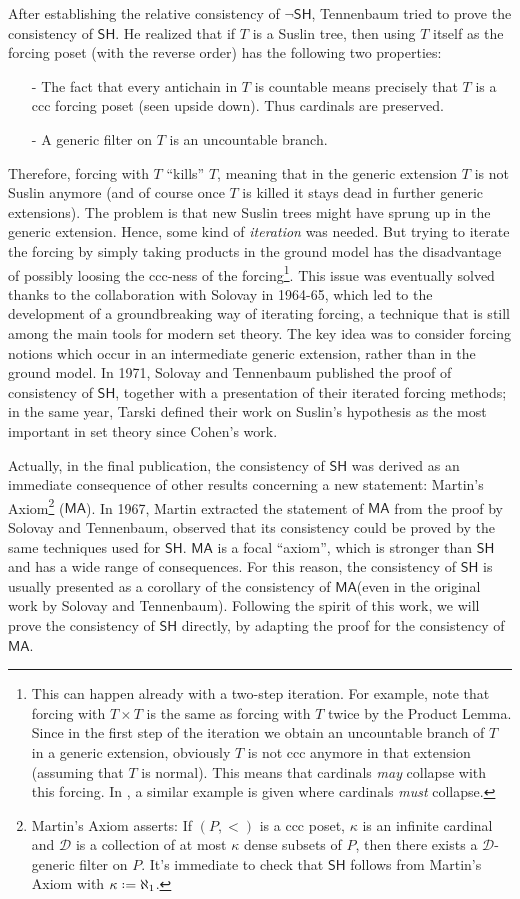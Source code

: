\documentclass[11pt,a4paper]{report}
\theoremstyle{definition}
\theoremstyle{num.custom-title}
\theoremstyle{custom-title}
\newcommand{\SH}{\ensuremath{\mathsf{SH}}\xspace}
\newcommand{\nSH}{\ensuremath{\neg\mathsf{SH}}\xspace}
\newcommand{\MA}{\ensuremath{\mathsf{MA}}\xspace}
\newcommand*{\defeq}{\mathrel{\rlap{%
                     \raisebox{0.3ex}{$\cdot$}}%
                     \raisebox{-0.3ex}{$\cdot$}}%
                     =}
\begin{document}
After establishing the relative consistency of $\nSH$, Tennenbaum tried to prove the consistency of $\SH$. He realized that if $T$ is a Suslin tree, then using $T$ itself as the forcing poset (with the reverse order) has the following two properties:
\begin{itemize}
\item[-] The fact that every antichain in $T$ is countable means precisely that $T$ is a ccc forcing poset (seen upside down). Thus cardinals are preserved.
\item[-] A generic filter on $T$ is an uncountable branch.
\end{itemize}
Therefore, forcing with $T$ ``kills'' $T$, meaning that in the generic extension $T$ is not Suslin anymore (and of course once $T$ is killed it stays dead in further generic extensions). The problem is that new Suslin trees might have sprung up in the generic extension. Hence, some kind of \emph{iteration} was needed. But trying to iterate the forcing by simply taking products in the ground model has the disadvantage of possibly loosing the ccc-ness of the forcing\footnote{This can happen already with a two-step iteration. For example, note that forcing with $T \times T$ is the same as forcing with $T$ twice by the Product Lemma. Since in the first step of the iteration we obtain an uncountable branch of $T$ in a generic extension, obviously $T$ is not ccc anymore in that extension (assuming that $T$ is normal). This means that cardinals \emph{may} collapse with this forcing. In \cite[p.\ 38]{Dev1974}, a similar example is given where cardinals \emph{must} collapse.}. This issue was eventually solved thanks to the collaboration with Solovay in 1964-65, which led to the development of a groundbreaking way of iterating forcing, a technique that is still among the main tools for modern set theory. The key idea was to consider forcing notions which occur in an intermediate generic extension, rather than in the ground model. In 1971, Solovay and Tennenbaum published \cite{Sol1971} the proof of consistency of \SH, together with a presentation of their iterated forcing methods; in the same year, Tarski defined their work on Suslin's hypothesis as the most important in set theory since Cohen's work.

Actually, in the final publication, the consistency of \SH was derived as an immediate consequence of other results concerning a new statement: Martin's Axiom\footnote{Martin's Axiom asserts: If $(P,<)$ is a ccc poset, $\kappa$ is an infinite cardinal and $\mathcal D$ is a collection of at most $\kappa$ dense subsets of $P$, then there exists a $\mathcal D$-generic filter on $P$. It's immediate to check that \SH follows from Martin's Axiom with $\kappa \defeq \aleph_1$.} (\MA). In 1967, Martin extracted the statement of \MA from the proof by Solovay and Tennenbaum, observed that its consistency could be proved by the same techniques used for \SH. \MA is a focal ``axiom'', which is stronger than \SH and has a wide range of consequences. For this reason, the consistency of \SH is usually presented as a corollary of the consistency of \MA (even in the original work by Solovay and Tennenbaum). Following the spirit of this work, we will prove the consistency of \SH directly, by adapting the proof for the consistency of \MA.
\end{document}
